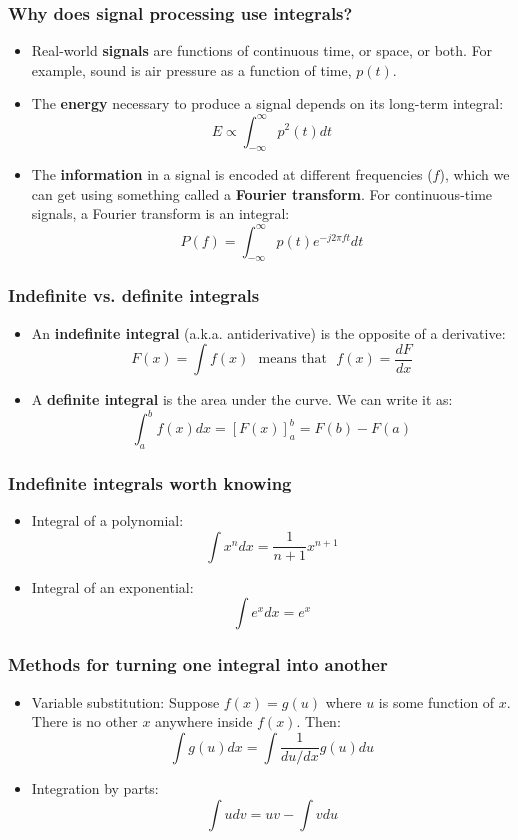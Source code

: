 \documentclass{beamer}
\begin{document}
\begin{frame}
  \frametitle{Why does signal processing use integrals?}
  \begin{itemize}
  \item Real-world {\bf signals} are functions of continuous time, or space,
    or both.  For example, sound is air pressure as a function of
    time, $p(t)$.
  \item The {\bf energy} necessary to produce a signal depends on its
    long-term integral:
    \[
    E \propto \int_{-\infty}^\infty p^2(t)dt
    \]
  \item The {\bf information} in a signal is encoded at different
    frequencies ($f$), which we can get using something called a {\bf
      Fourier transform}.  For continuous-time signals, a Fourier
    transform is an integral:
    \[
    P(f) = \int_{-\infty}^\infty p(t)e^{-j2\pi f t}dt
    \]
  \end{itemize}
\end{frame}
    
\begin{frame}
  \frametitle{Indefinite vs. definite integrals}
  \begin{itemize}
  \item An {\bf indefinite integral} (a.k.a. antiderivative) is the opposite
    of a derivative:
    \[
    F(x) = \int f(x) ~~~\mbox{means that}~~~ f(x) = \frac{dF}{dx}
    \]
  \item A {\bf definite integral} is the area under the curve.  We can write it as:
    \[
    \int_a^b f(x)dx = \left[F(x)\right]_a^b = F(b)-F(a)
    \]
  \end{itemize}
\end{frame}

\begin{frame}
  \frametitle{Indefinite integrals worth knowing}
  \begin{itemize}
  \item Integral of a polynomial:
    \[
    \int x^n dx = \frac{1}{n+1} x^{n+1}
    \]
  \item Integral of an exponential:
    \[
    \int e^{x} dx = e^{x}
    \]
  \end{itemize}
\end{frame}

\begin{frame}
  \frametitle{Methods for turning one integral into another}
  \begin{itemize}
  \item Variable substitution: Suppose $f(x)=g(u)$ where $u$ is some
    function of $x$.  There is no other $x$ anywhere inside $f(x)$.  Then:
    \[
    \int g(u)dx = \int \frac{1}{du/dx}g(u)du
    \]
  \item
    Integration by parts:
    \[
    \int u dv = uv - \int v du
    \]
  \end{itemize}
\end{frame}
\end{document}
